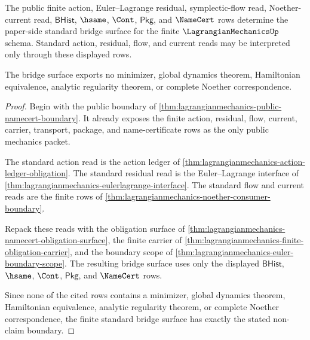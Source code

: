 \begin{theorem}
\label{thm:lagrangianmechanics-finite-standard-bridge-surface}
The public finite action, Euler--Lagrange residual, symplectic-flow read,
Noether-current read, $\mathsf{BHist}$, $\hsame$, $\Cont$, $\mathsf{Pkg}$, and
$\NameCert$ rows determine the paper-side standard bridge surface for the
finite $\LagrangianMechanicsUp$ schema. Standard action, residual, flow, and
current reads may be interpreted only through these displayed rows.

The bridge surface exports no minimizer, global dynamics theorem, Hamiltonian
equivalence, analytic regularity theorem, or complete Noether correspondence.
\end{theorem}
\begin{proof}
Begin with the public boundary of
\autoref{thm:lagrangianmechanics-public-namecert-boundary}. It already exposes
the finite action, residual, flow, current, carrier, transport, package, and
name-certificate rows as the only public mechanics packet.

The standard action read is the action ledger of
\autoref{thm:lagrangianmechanics-action-ledger-obligation}. The standard
residual read is the Euler--Lagrange interface of
\autoref{thm:lagrangianmechanics-eulerlagrange-interface}. The standard flow
and current reads are the finite rows of
\autoref{thm:lagrangianmechanics-noether-consumer-boundary}.

Repack these reads with the obligation surface of
\autoref{thm:lagrangianmechanics-namecert-obligation-surface}, the finite
carrier of \autoref{thm:lagrangianmechanics-finite-obligation-carrier}, and
the boundary scope of \autoref{thm:lagrangianmechanics-euler-boundary-scope}.
The resulting bridge surface uses only the displayed $\mathsf{BHist}$,
$\hsame$, $\Cont$, $\mathsf{Pkg}$, and $\NameCert$ rows.

Since none of the cited rows contains a minimizer, global dynamics theorem,
Hamiltonian equivalence, analytic regularity theorem, or complete Noether
correspondence, the finite standard bridge surface has exactly the stated
non-claim boundary.
\end{proof}

